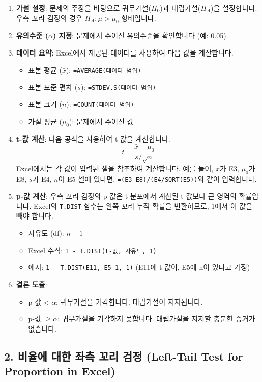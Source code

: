 \documentclass[11pt,a4paper]{book}
\theoremstyle{definition}
\begin{document}
\begin{enumerate}
    \item \textbf{가설 설정}: 문제의 주장을 바탕으로 귀무가설($H_0$)과 대립가설($H_A$)을 설정합니다. 우측 꼬리 검정의 경우 $H_A: \mu > \mu_0$ 형태입니다.
    \item \textbf{유의수준 ($\alpha$) 지정}: 문제에서 주어진 유의수준을 확인합니다 (예: 0.05).
    \item \textbf{데이터 요약}: Excel에서 제공된 데이터를 사용하여 다음 값을 계산합니다.
    \begin{itemize}
        \item 표본 평균 ($\bar{x}$): \texttt{=AVERAGE(데이터 범위)}
        \item 표본 표준 편차 ($s$): \texttt{=STDEV.S(데이터 범위)}
        \item 표본 크기 ($n$): \texttt{=COUNT(데이터 범위)}
        \item 가설 평균 ($\mu_0$): 문제에서 주어진 값
    \end{itemize}
    \item \textbf{t-값 계산}: 다음 공식을 사용하여 t-값을 계산합니다.
    $$t = \frac{\bar{x} - \mu_0}{s/\sqrt{n}}$$
    Excel에서는 각 값이 입력된 셀을 참조하여 계산합니다. 예를 들어, $\bar{x}$가 E3, $\mu_0$가 E8, $s$가 E4, $n$이 E5 셀에 있다면, \texttt{=(E3-E8)/(E4/SQRT(E5))}와 같이 입력합니다.
    \item \textbf{p-값 계산}: 우측 꼬리 검정의 p-값은 t-분포에서 계산된 t-값보다 큰 영역의 확률입니다. Excel의 \texttt{T.DIST} 함수는 왼쪽 꼬리 누적 확률을 반환하므로, 1에서 이 값을 빼야 합니다.
    \begin{itemize}
        \item 자유도 (df): $n-1$
        \item Excel 수식: \texttt{1 - T.DIST(t-값, 자유도, 1)}
        \item 예시: \texttt{1 - T.DIST(E11, E5-1, 1)} (E11에 t-값이, E5에 n이 있다고 가정)
    \end{itemize}
    \item \textbf{결론 도출}:
    \begin{itemize}
        \item p-값 < $\alpha$: 귀무가설을 기각합니다. 대립가설이 지지됩니다.
        \item p-값 $\ge \alpha$: 귀무가설을 기각하지 못합니다. 대립가설을 지지할 충분한 증거가 없습니다.
    \end{itemize}
\end{enumerate}

\subsection*{2. 비율에 대한 좌측 꼬리 검정 (Left-Tail Test for Proportion in Excel)}
\end{document}
